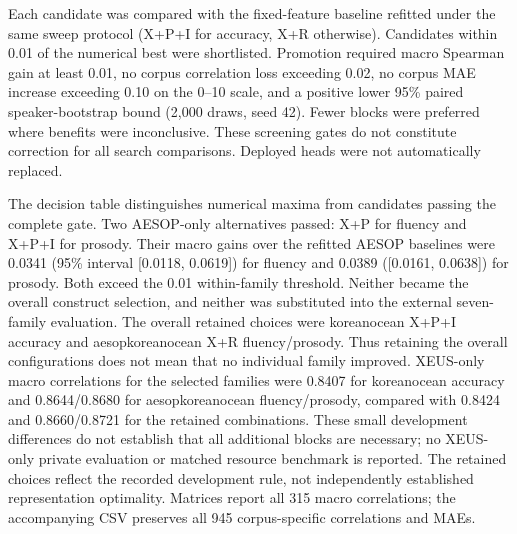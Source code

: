 \documentclass[10pt]{article}
\begin{document}
Each candidate was compared with the fixed-feature baseline refitted under the same sweep protocol (X+P+I for accuracy, X+R otherwise). Candidates within 0.01 of the numerical best were shortlisted. Promotion required macro Spearman gain at least 0.01, no corpus correlation loss exceeding 0.02, no corpus MAE increase exceeding 0.10 on the 0--10 scale, and a positive lower 95\% paired speaker-bootstrap bound (2,000 draws, seed 42). Fewer blocks were preferred where benefits were inconclusive. These screening gates do not constitute correction for all search comparisons. Deployed heads were not automatically replaced.

The decision table distinguishes numerical maxima from candidates passing the complete gate. Two AESOP-only alternatives passed: X+P for fluency and X+P+I for prosody. Their macro gains over the refitted AESOP baselines were 0.0341 (95\% interval [0.0118, 0.0619]) for fluency and 0.0389 ([0.0161, 0.0638]) for prosody. Both exceed the 0.01 within-family threshold. Neither became the overall construct selection, and neither was substituted into the external seven-family evaluation. The overall retained choices were koreanocean X+P+I accuracy and aesopkoreanocean X+R fluency/prosody. Thus retaining the overall configurations does not mean that no individual family improved. XEUS-only macro correlations for the selected families were 0.8407 for koreanocean accuracy and 0.8644/0.8680 for aesopkoreanocean fluency/prosody, compared with 0.8424 and 0.8660/0.8721 for the retained combinations. These small development differences do not establish that all additional blocks are necessary; no XEUS-only private evaluation or matched resource benchmark is reported. The retained choices reflect the recorded development rule, not independently established representation optimality. Matrices report all 315 macro correlations; the accompanying CSV preserves all 945 corpus-specific correlations and MAEs.
\end{document}
